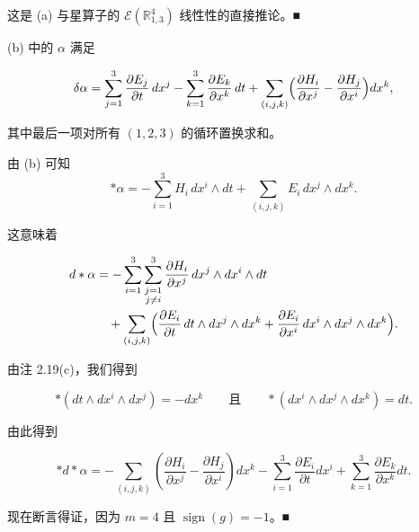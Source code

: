 \begin{example}
\begin{items}
\proofhead
这是 (a) 与星算子的 $ \mathcal{E}(\mathbb{R}^{4}_{1,3}) $ 线性性的直接推论。\nobreak\hspace{0.35em}■
\item

(b) 中的 $ \alpha $ 满足

\[
\delta\alpha = \sum_{j=1}^{3}\frac{\partial E_{j}}{\partial t}\,dx^{j} - \sum_{k=1}^{3}\frac{\partial E_{k}}{\partial x^{k}}\,dt + \sum_{(i,j,k)}\Bigl(\frac{\partial H_{i}}{\partial x^{j}} - \frac{\partial H_{j}}{\partial x^{i}}\Bigr)dx^{k} ,
\]

其中最后一项对所有 $ (1,2,3) $ 的循环置换求和。

\proofhead
由 (b) 可知
\[
\ast\alpha = -\sum_{i=1}^{3}H_{i}\,dx^{i} \wedge dt + \sum_{(i,j,k)}E_{i}\,dx^{j} \wedge dx^{k} .
\]

这意味着

\begin{equation*}
\begin{aligned}
d\ast\alpha &= -\sum_{i=1}^{3}\sum_{\substack{j=1 \\ j \ne i}}^{3}\frac{\partial H_{i}}{\partial x^{j}}\,dx^{j} \wedge dx^{i} \wedge dt \\ &\quad + \sum_{(i,j,k)}\Bigl(\frac{\partial E_{i}}{\partial t}\,dt \wedge dx^{j} \wedge dx^{k} + \frac{\partial E_{i}}{\partial x^{i}}\,dx^{i} \wedge dx^{j} \wedge dx^{k}\Bigr) .
\end{aligned}
\end{equation*}

由注 2.19(c)，我们得到

\[
\ast(dt \wedge dx^{i} \wedge dx^{j}) = -dx^{k} \qquad \text{且} \qquad \ast(dx^{i} \wedge dx^{j} \wedge dx^{k}) = dt .
\]

由此得到

\[
\ast d\ast\alpha = -\sum_{(i,j,k)} \left( \frac{\partial H_{i}}{\partial x^{j}} - \frac{\partial H_{j}}{\partial x^{i}} \right) dx^{k} - \sum_{i=1}^{3} \frac{\partial E_{i}}{\partial t} dx^{i} + \sum_{k=1}^{3} \frac{\partial E_{k}}{\partial x^{k}} dt .
\]

现在断言得证，因为 $ m = 4 $ 且 $ \operatorname{sign}(g) = -1 $。\nobreak\hspace{0.35em}■

\end{items}

\end{example}

\exerciseshead

